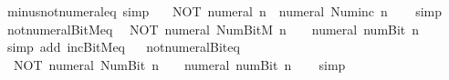 \begin{isabellebody}
\endisatagproof
{\isafoldproof}%
%
\isadelimproof
\isanewline
%
\endisadelimproof
\isanewline
{}\isamarkupfalse%
\ minus{\isacharunderscore}{\kern0pt}not{\isacharunderscore}{\kern0pt}numeral{\isacharunderscore}{\kern0pt}eq\ {\isacharbrackleft}{\kern0pt}simp{\isacharbrackright}{\kern0pt}{\isacharcolon}{\kern0pt}\isanewline
\ \ {\isacartoucheopen}{\isacharminus}{\kern0pt}\ {\isacharparenleft}{\kern0pt}NOT\ {\isacharparenleft}{\kern0pt}numeral\ n{\isacharparenright}{\kern0pt}{\isacharparenright}{\kern0pt}\ {\isacharequal}{\kern0pt}\ numeral\ {\isacharparenleft}{\kern0pt}Num{\isachardot}{\kern0pt}inc\ n{\isacharparenright}{\kern0pt}{\isacartoucheclose}\isanewline
%
\isadelimproof
\ \ %
\endisadelimproof
%
\isatagproof
{}\isamarkupfalse%
\ simp%
\endisatagproof
{\isafoldproof}%
%
\isadelimproof
\isanewline
%
\endisadelimproof
\isanewline
{}\isamarkupfalse%
\ not{\isacharunderscore}{\kern0pt}numeral{\isacharunderscore}{\kern0pt}BitM{\isacharunderscore}{\kern0pt}eq{\isacharcolon}{\kern0pt}\isanewline
\ \ {\isacartoucheopen}NOT\ {\isacharparenleft}{\kern0pt}numeral\ {\isacharparenleft}{\kern0pt}Num{\isachardot}{\kern0pt}BitM\ n{\isacharparenright}{\kern0pt}{\isacharparenright}{\kern0pt}\ {\isacharequal}{\kern0pt}\ \ {\isacharminus}{\kern0pt}\ numeral\ {\isacharparenleft}{\kern0pt}num{\isachardot}{\kern0pt}Bit{}\ n{\isacharparenright}{\kern0pt}{\isacartoucheclose}\isanewline
%
\isadelimproof
\ \ %
\endisadelimproof
%
\isatagproof
{}\isamarkupfalse%
\ {\isacharparenleft}{\kern0pt}simp\ add{\isacharcolon}{\kern0pt}\ inc{\isacharunderscore}{\kern0pt}BitM{\isacharunderscore}{\kern0pt}eq{\isacharparenright}{\kern0pt}%
\endisatagproof
{\isafoldproof}%
%
\isadelimproof
\ \isanewline
%
\endisadelimproof
\isanewline
{}\isamarkupfalse%
\ not{\isacharunderscore}{\kern0pt}numeral{\isacharunderscore}{\kern0pt}Bit{}{\isacharunderscore}{\kern0pt}eq{\isacharcolon}{\kern0pt}\isanewline
\ \ {\isacartoucheopen}NOT\ {\isacharparenleft}{\kern0pt}numeral\ {\isacharparenleft}{\kern0pt}Num{\isachardot}{\kern0pt}Bit{}\ n{\isacharparenright}{\kern0pt}{\isacharparenright}{\kern0pt}\ {\isacharequal}{\kern0pt}\ \ {\isacharminus}{\kern0pt}\ numeral\ {\isacharparenleft}{\kern0pt}num{\isachardot}{\kern0pt}Bit{}\ n{\isacharparenright}{\kern0pt}{\isacartoucheclose}\isanewline
%
\isadelimproof
\ \ %
\endisadelimproof
%
\isatagproof
{}\isamarkupfalse%
\ simp%
\endisatagproof
{\isafoldproof}%
%
\isadelimproof
\isanewline
%
\endisadelimproof
\isanewline
{}\isamarkupfalse%

\end{isabellebody}
